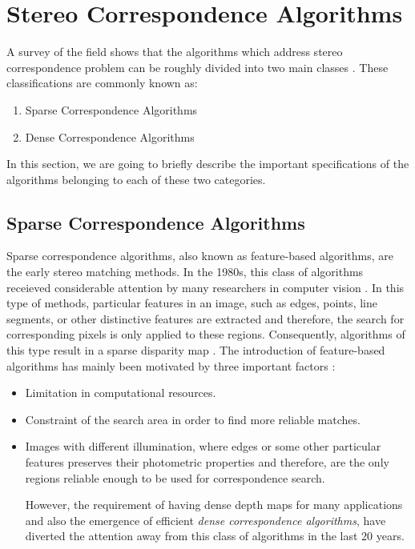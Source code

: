 \documentclass[dvips,letterpaper,12pt]{report}
\begin{document}
\section{Stereo Correspondence Algorithms}
A survey of the field shows that the algorithms which address stereo correspondence problem can be roughly divided into two main classes \cite{sch02}. These classifications are commonly known as:
\begin{enumerate}
\item Sparse Correspondence Algorithms
\item Dense Correspondence Algorithms 
\end{enumerate}

In this section, we are going to briefly describe the important specifications of the algorithms belonging to each of these two categories.
\subsection{Sparse Correspondence Algorithms}
Sparse correspondence algorithms, also known as feature-based algorithms, are the early stereo matching methods. In the 1980s, this class of algorithms receieved considerable attention by
many researchers in computer vision \cite{dhon89}.
In this type of methods, particular features in an image, such as edges, 
points, line segments, or other distinctive features are extracted and therefore, the search for corresponding pixels is only applied to these regions. Consequently, algorithms of this
type result in a sparse disparity map \cite{matt89,hsie92, sze11}. The introduction of feature-based algorithms has mainly been motivated by three important factors \cite{bro03,sze11}:
\begin{itemize}
\item Limitation in computational resources.
\item Constraint of the search area in order to find more reliable matches.
\item Images with different illumination, where edges or some other particular features preserves their photometric properties and therefore, are the only regions reliable enough to 
be used for correspondence search.

However, the requirement of having dense depth maps for many applications and also the emergence of efficient {\it dense correspondence algorithms}, have diverted the attention away
from this class of algorithms in the last 20 years.
\end{itemize}
\end{document}
